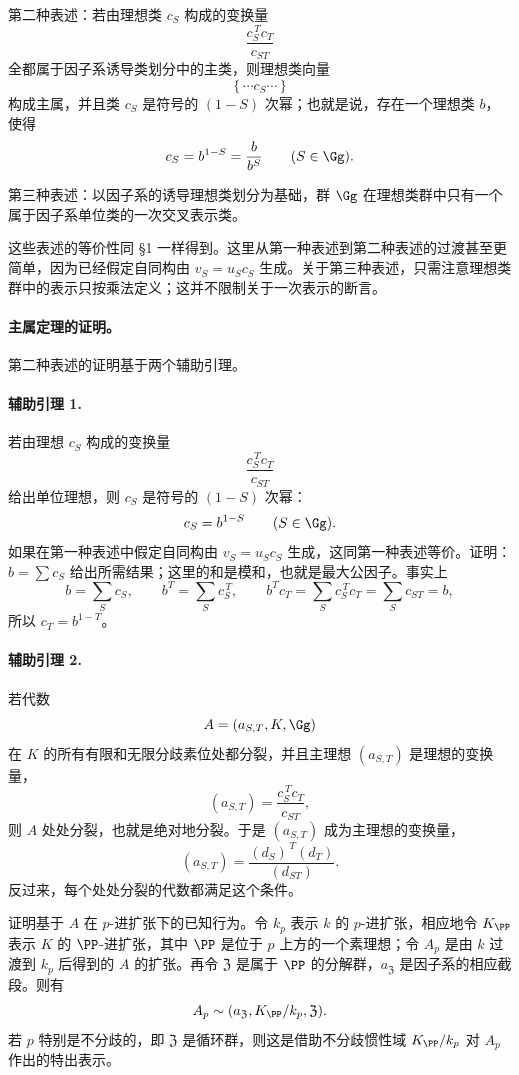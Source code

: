 第二种表述：若由理想类 \(c_S\) 构成的变换量
\[
        \frac{c_S^{\,T}c_T}{c_{ST}}
\]
全都属于因子系诱导类划分中的主类，则理想类向量
\[
        \{\,\cdots c_S\cdots\,\}
\]
构成主属，并且类 \(c_S\) 是符号的 \((1-S)\) 次幂；也就是说，存在一个理想类 \(b\)，使得
\[
        c_S=b^{1-S}=\frac{b}{b^S}\qquad(S\in\Gg).
\]

第三种表述：以因子系的诱导理想类划分为基础，群 \(\Gg\) 在理想类群中只有一个属于因子系单位类的一次交叉表示类。

这些表述的等价性同 §1 一样得到。这里从第一种表述到第二种表述的过渡甚至更简单，因为已经假定自同构由 \(v_S=u_Sc_S\) 生成。关于第三种表述，只需注意理想类群中的表示只按乘法定义；这并不限制关于一次表示的断言。

\paragraph{主属定理的证明。}
第二种表述的证明基于两个辅助引理。

\paragraph{辅助引理 1.}
若由理想 \(c_S\) 构成的变换量
\[
        \frac{c_S^{\,T}c_T}{c_{ST}}
\]
给出单位理想，则 \(c_S\) 是符号的 \((1-S)\) 次幂：
\[
        c_S=b^{1-S}\qquad(S\in\Gg).
\]
如果在第一种表述中假定自同构由 \(v_S=u_Sc_S\) 生成，这同第一种表述等价。证明：\(b=\sum c_S\) 给出所需结果；这里的和是模和，也就是最大公因子。事实上
\[
        b=\sum_S c_S,\qquad
        b^T=\sum_S c_S^{\,T},\qquad
        b^T c_T=\sum_S c_S^{\,T}c_T=\sum_S c_{ST}=b,
\]
所以 \(c_T=b^{1-T}\)。

\paragraph{辅助引理 2.}
若代数
\[
        A=(a_{S,T},K,\Gg)
\]
在 \(K\) 的所有有限和无限分歧素位处都分裂，并且主理想 \((a_{S,T})\) 是理想的变换量，
\[
        (a_{S,T})=\frac{c_S^{\,T}c_T}{c_{ST}},
\]
则 \(A\) 处处分裂，也就是绝对地分裂。于是 \((a_{S,T})\) 成为主理想的变换量，
\[
        (a_{S,T})=\frac{(d_S)^{\,T}(d_T)}{(d_{ST})}.
\]
反过来，每个处处分裂的代数都满足这个条件。

证明基于 \(A\) 在 \(p\)-进扩张下的已知行为。令 \(k_p\) 表示 \(k\) 的 \(p\)-进扩张，相应地令 \(K_\PP\) 表示 \(K\) 的 \(\PP\)-进扩张，其中 \(\PP\) 是位于 \(p\) 上方的一个素理想；令 \(A_p\) 是由 \(k\) 过渡到 \(k_p\) 后得到的 \(A\) 的扩张。再令 \(\mathfrak Z\) 是属于 \(\PP\) 的分解群，\(a_{\mathfrak Z}\) 是因子系的相应截段。则有
\[
        A_p\sim (a_{\mathfrak Z},K_\PP/k_p,\mathfrak Z).
\]
若 \(p\) 特别是不分歧的，即 \(\mathfrak Z\) 是循环群，则这是借助不分歧惯性域 \(K_\PP/k_p\) 对 \(A_p\) 作出的特出表示。

